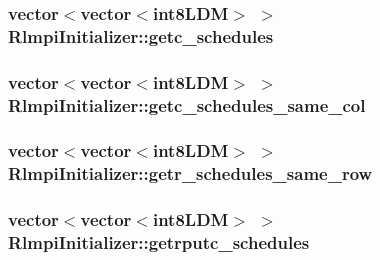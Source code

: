\label{classRlmpiInitializer_a14302e2309ab3ce6da75f822d5ead6bc}
\hypertarget{classRlmpiInitializer_a884544b454acc8ab2d7708b3d014df18}{
\subsubsection[{getc\_\-schedules}]{\setlength{\rightskip}{0pt plus 5cm}vector$<$vector$<${\bf int8LDM}$>$ $>$ {\bf RlmpiInitializer::getc\_\-schedules}}}
\label{classRlmpiInitializer_a884544b454acc8ab2d7708b3d014df18}
\hypertarget{classRlmpiInitializer_a63308daede91a0421f67807599a493ce}{
\subsubsection[{getc\_\-schedules\_\-same\_\-col}]{\setlength{\rightskip}{0pt plus 5cm}vector$<$vector$<${\bf int8LDM}$>$ $>$ {\bf RlmpiInitializer::getc\_\-schedules\_\-same\_\-col}}}
\label{classRlmpiInitializer_a63308daede91a0421f67807599a493ce}
\hypertarget{classRlmpiInitializer_adf5cced6566acc06f9395e91cf4e4f14}{
\subsubsection[{getr\_\-schedules\_\-same\_\-row}]{\setlength{\rightskip}{0pt plus 5cm}vector$<$vector$<${\bf int8LDM}$>$ $>$ {\bf RlmpiInitializer::getr\_\-schedules\_\-same\_\-row}}}
\label{classRlmpiInitializer_adf5cced6566acc06f9395e91cf4e4f14}
\hypertarget{classRlmpiInitializer_ab3cd44876cccbd2cc88abfcb665a3158}{
\subsubsection[{getrputc\_\-schedules}]{\setlength{\rightskip}{0pt plus 5cm}vector$<$vector$<${\bf int8LDM}$>$ $>$ {\bf RlmpiInitializer::getrputc\_\-schedules}}}
